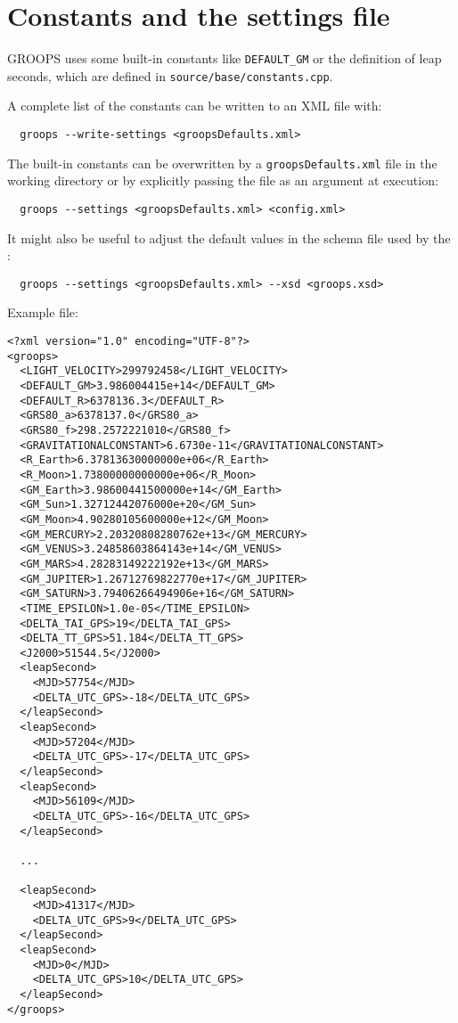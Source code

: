 \section{Constants and the settings file}\label{general.constants}
GROOPS uses some built-in constants like \verb|DEFAULT_GM| or the definition
of leap seconds, which are defined in  \verb|source/base/constants.cpp|.

A complete list of the constants can be written to an XML file with:
\begin{verbatim}
  groops --write-settings <groopsDefaults.xml>
\end{verbatim}

The built-in constants can be overwritten by a \verb|groopsDefaults.xml| file
in the working directory or by explicitly passing the file as an argument at execution:
\begin{verbatim}
  groops --settings <groopsDefaults.xml> <config.xml>
\end{verbatim}

It might also be useful to adjust the default values in the schema file used by the :
\begin{verbatim}
  groops --settings <groopsDefaults.xml> --xsd <groops.xsd>
\end{verbatim}

Example file:
\begin{verbatim}
<?xml version="1.0" encoding="UTF-8"?>
<groops>
  <LIGHT_VELOCITY>299792458</LIGHT_VELOCITY>
  <DEFAULT_GM>3.986004415e+14</DEFAULT_GM>
  <DEFAULT_R>6378136.3</DEFAULT_R>
  <GRS80_a>6378137.0</GRS80_a>
  <GRS80_f>298.2572221010</GRS80_f>
  <GRAVITATIONALCONSTANT>6.6730e-11</GRAVITATIONALCONSTANT>
  <R_Earth>6.37813630000000e+06</R_Earth>
  <R_Moon>1.73800000000000e+06</R_Moon>
  <GM_Earth>3.98600441500000e+14</GM_Earth>
  <GM_Sun>1.32712442076000e+20</GM_Sun>
  <GM_Moon>4.90280105600000e+12</GM_Moon>
  <GM_MERCURY>2.20320808280762e+13</GM_MERCURY>
  <GM_VENUS>3.24858603864143e+14</GM_VENUS>
  <GM_MARS>4.28283149222192e+13</GM_MARS>
  <GM_JUPITER>1.26712769822770e+17</GM_JUPITER>
  <GM_SATURN>3.79406266494906e+16</GM_SATURN>
  <TIME_EPSILON>1.0e-05</TIME_EPSILON>
  <DELTA_TAI_GPS>19</DELTA_TAI_GPS>
  <DELTA_TT_GPS>51.184</DELTA_TT_GPS>
  <J2000>51544.5</J2000>
  <leapSecond>
    <MJD>57754</MJD>
    <DELTA_UTC_GPS>-18</DELTA_UTC_GPS>
  </leapSecond>
  <leapSecond>
    <MJD>57204</MJD>
    <DELTA_UTC_GPS>-17</DELTA_UTC_GPS>
  </leapSecond>
  <leapSecond>
    <MJD>56109</MJD>
    <DELTA_UTC_GPS>-16</DELTA_UTC_GPS>
  </leapSecond>

  ...

  <leapSecond>
    <MJD>41317</MJD>
    <DELTA_UTC_GPS>9</DELTA_UTC_GPS>
  </leapSecond>
  <leapSecond>
    <MJD>0</MJD>
    <DELTA_UTC_GPS>10</DELTA_UTC_GPS>
  </leapSecond>
</groops>
\end{verbatim}
